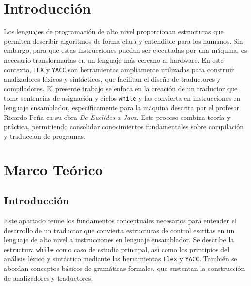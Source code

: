 \documentclass{article}
\begin{document}


\section{Introducción}\label{sec:intr}

Los lenguajes de programación de alto nivel proporcionan estructuras que permiten describir algoritmos de forma clara y entendible para los humanos. Sin embargo, para que estas instrucciones puedan ser ejecutadas por una máquina, es necesario transformarlas en un lenguaje más cercano al hardware. En este contexto, \texttt{LEX} y \texttt{YACC} son herramientas ampliamente utilizadas para construir analizadores léxicos y sintácticos, que facilitan el diseño de traductores y compiladores. El presente trabajo se enfoca en la creación de un traductor que tome sentencias de asignación y ciclos \texttt{while} y las convierta en instrucciones en lenguaje ensamblador, específicamente para la máquina descrita por el profesor Ricardo Peña en su obra \textit{De Euclides a Java}. Este proceso combina teoría y práctica, permitiendo consolidar conocimientos fundamentales sobre compilación y traducción de programas.

\section{Marco Teórico}\label{sec:marc}

\subsection*{Introducción}

Este apartado reúne los fundamentos conceptuales necesarios para entender el desarrollo de un traductor que convierta estructuras de control escritas en un lenguaje de alto nivel a instrucciones en lenguaje ensamblador. Se describe la estructura \texttt{while} como caso de estudio principal, así como los principios del análisis léxico y sintáctico mediante las herramientas \texttt{Flex} y \texttt{YACC}. También se abordan conceptos básicos de gramáticas formales, que sustentan la construcción de analizadores y traductores.
\end{document}
